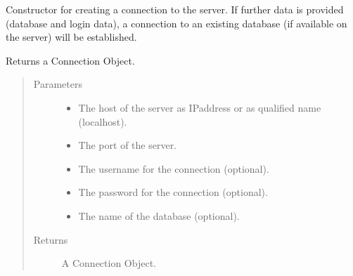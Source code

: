 \documentclass[letterpaper,10pt,english]{sphinxmanual}
\begin{document}
\begin{fulllineitems}
\label{\detokenize{index:secondodb.api.secondoapi.connect}}
Constructor for creating a connection to the  server. If further data is provided (database and login data),
a connection to an existing database (if available on the server) will be established.

Returns a Connection Object.
\begin{quote}\begin{description}
\item[{Parameters}] \leavevmode\begin{itemize}
\item {} 
 \textendash{} The host of the  server as IP\sphinxhyphen{}address or as qualified name (localhost).

\item {} 
 \textendash{} The port of the  server.

\item {} 
 \textendash{} The username for the connection (optional).

\item {} 
 \textendash{} The password for the connection (optional).

\item {} 
 \textendash{} The name of the database (optional).

\end{itemize}

\item[{Returns}] \leavevmode
A Connection Object.

\end{description}\end{quote}

\end{fulllineitems}
\end{document}
